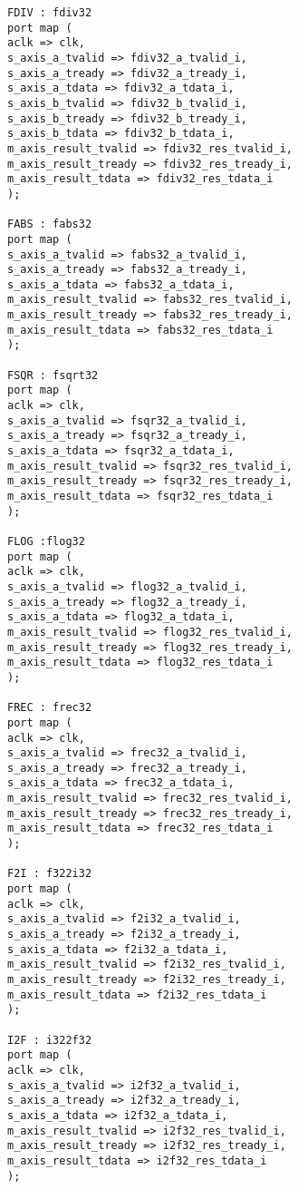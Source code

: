 \documentclass[conference]{IEEEtran}
\begin{document}
\begin{lstlisting}
FDIV : fdiv32
port map (
aclk => clk,
s_axis_a_tvalid => fdiv32_a_tvalid_i,
s_axis_a_tready => fdiv32_a_tready_i,
s_axis_a_tdata => fdiv32_a_tdata_i,
s_axis_b_tvalid => fdiv32_b_tvalid_i,
s_axis_b_tready => fdiv32_b_tready_i,
s_axis_b_tdata => fdiv32_b_tdata_i,
m_axis_result_tvalid => fdiv32_res_tvalid_i,
m_axis_result_tready => fdiv32_res_tready_i,
m_axis_result_tdata => fdiv32_res_tdata_i
);

FABS : fabs32
port map (
s_axis_a_tvalid => fabs32_a_tvalid_i,
s_axis_a_tready => fabs32_a_tready_i,
s_axis_a_tdata => fabs32_a_tdata_i,
m_axis_result_tvalid => fabs32_res_tvalid_i,
m_axis_result_tready => fabs32_res_tready_i,
m_axis_result_tdata => fabs32_res_tdata_i
);

FSQR : fsqrt32
port map (
aclk => clk,
s_axis_a_tvalid => fsqr32_a_tvalid_i,
s_axis_a_tready => fsqr32_a_tready_i,
s_axis_a_tdata => fsqr32_a_tdata_i,
m_axis_result_tvalid => fsqr32_res_tvalid_i,
m_axis_result_tready => fsqr32_res_tready_i,
m_axis_result_tdata => fsqr32_res_tdata_i
);

FLOG :flog32
port map (
aclk => clk,
s_axis_a_tvalid => flog32_a_tvalid_i,
s_axis_a_tready => flog32_a_tready_i,
s_axis_a_tdata => flog32_a_tdata_i,
m_axis_result_tvalid => flog32_res_tvalid_i,
m_axis_result_tready => flog32_res_tready_i,
m_axis_result_tdata => flog32_res_tdata_i
);

FREC : frec32
port map (
aclk => clk,
s_axis_a_tvalid => frec32_a_tvalid_i,
s_axis_a_tready => frec32_a_tready_i,
s_axis_a_tdata => frec32_a_tdata_i,
m_axis_result_tvalid => frec32_res_tvalid_i,
m_axis_result_tready => frec32_res_tready_i,
m_axis_result_tdata => frec32_res_tdata_i
);

F2I : f322i32
port map (
aclk => clk,
s_axis_a_tvalid => f2i32_a_tvalid_i,
s_axis_a_tready => f2i32_a_tready_i,
s_axis_a_tdata => f2i32_a_tdata_i,
m_axis_result_tvalid => f2i32_res_tvalid_i,
m_axis_result_tready => f2i32_res_tready_i,
m_axis_result_tdata => f2i32_res_tdata_i
);

I2F : i322f32
port map (
aclk => clk,
s_axis_a_tvalid => i2f32_a_tvalid_i,
s_axis_a_tready => i2f32_a_tready_i,
s_axis_a_tdata => i2f32_a_tdata_i,
m_axis_result_tvalid => i2f32_res_tvalid_i,
m_axis_result_tready => i2f32_res_tready_i,
m_axis_result_tdata => i2f32_res_tdata_i
);


\end{lstlisting}
\end{document}
